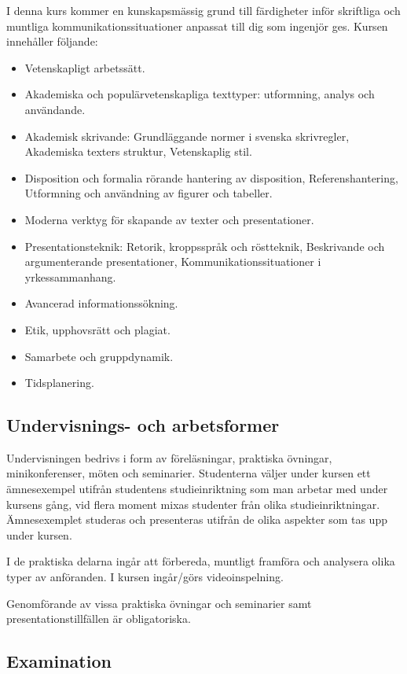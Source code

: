 I denna kurs kommer en kunskapsmässig grund till färdigheter inför
skriftliga och muntliga kommunikationssituationer anpassat till dig som
ingenjör ges. Kursen innehåller följande:

\begin{itemize}
\tightlist
\item
  Vetenskapligt arbetssätt.
\item
  Akademiska och populärvetenskapliga texttyper: utformning, analys och
  användande.
\item
  Akademisk skrivande: Grundläggande normer i svenska skrivregler,
  Akademiska texters struktur, Vetenskaplig stil.
\item
  Disposition och formalia rörande hantering av disposition,
  Referenshantering, Utformning och användning av figurer och tabeller.
\item
  Moderna verktyg för skapande av texter och presentationer.
\item
  Presentationsteknik: Retorik, kroppsspråk och röstteknik, Beskrivande
  och argumenterande presentationer, Kommunikationssituationer i
  yrkessammanhang.
\item
  Avancerad informationssökning.
\item
  Etik, upphovsrätt och plagiat.
\item
  Samarbete och gruppdynamik.
\item
  Tidsplanering.
\end{itemize}

\subsection*{Undervisnings- och
arbetsformer}

Undervisningen bedrivs i form av föreläsningar, praktiska övningar,
minikonferenser, möten och seminarier. Studenterna väljer under kursen
ett ämnesexempel utifrån studentens studieinriktning som man arbetar med
under kursens gång, vid flera moment mixas studenter från olika
studieinriktningar. Ämnesexemplet studeras och presenteras utifrån de
olika aspekter som tas upp under kursen.

I de praktiska delarna ingår att förbereda, muntligt framföra och
analysera olika typer av anföranden. I kursen ingår/görs
videoinspelning.

Genomförande av vissa praktiska övningar och seminarier samt
presentationstillfällen är obligatoriska.

\subsection*{Examination}

